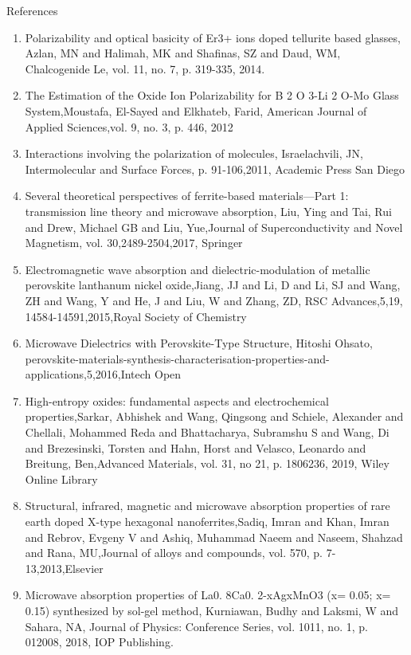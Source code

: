 \documentclass[11pt,aspect ratio=169]{beamer}
\begin{document}
\begin{frame}[allowframebreaks]{References}
\begin{enumerate}
\item
 Polarizability and optical basicity of Er3+ ions doped tellurite based glasses,
	Azlan, MN and Halimah, MK and Shafinas, SZ and Daud, WM,
Chalcogenide Le,	vol. 11,	no. 7,	p. 319-335,	2014.

\item
 The Estimation of the Oxide Ion Polarizability for B 2 O 3-Li 2 O-Mo Glass System,Moustafa, El-Sayed and Elkhateb, Farid,
American Journal of Applied Sciences,vol. 9,	no. 3,	p. 446,
2012

\item
 Interactions involving the polarization of molecules,
Israelachvili, JN,
Intermolecular and Surface Forces,
p. 91-106,2011,	Academic Press San Diego

\item Several theoretical perspectives of ferrite-based materials—Part 1: transmission line theory and microwave absorption,	Liu, Ying and Tai, Rui and Drew, Michael GB and Liu, Yue,Journal of Superconductivity and Novel Magnetism,
	vol. 30,2489-2504,2017,
	Springer

\item
 Electromagnetic wave absorption and dielectric-modulation of metallic perovskite lanthanum nickel oxide,Jiang, JJ and Li, D and Li, SJ and Wang, ZH and Wang, Y and He, J and Liu, W and Zhang, ZD, RSC Advances,5,19,
14584-14591,2015,Royal Society of Chemistry

\item Microwave Dielectrics with Perovskite-Type Structure,
Hitoshi Ohsato,
perovskite-materials-synthesis-characterisation-properties-and-applications,5,2016,Intech Open

\item High-entropy oxides: fundamental aspects and electrochemical properties,Sarkar, Abhishek and Wang, Qingsong and Schiele, Alexander and Chellali, Mohammed Reda and Bhattacharya, Subramshu S and Wang, Di and Brezesinski, Torsten and Hahn, Horst and Velasco, Leonardo and Breitung, Ben,Advanced Materials,
	vol. 31,
	no 21,
	p. 1806236,
	2019,
	Wiley Online Library

\item Structural, infrared, magnetic and microwave absorption properties of rare earth doped X-type hexagonal nanoferrites,Sadiq, Imran and Khan, Imran and Rebrov, Evgeny V and Ashiq, Muhammad Naeem and Naseem, Shahzad and Rana, MU,Journal of alloys and compounds,
	vol. 570,
	p. 7-13,2013,Elsevier
	
	
\item   Microwave absorption properties of La0. 8Ca0. 2-xAgxMnO3 (x= 0.05; x= 0.15) synthesized by sol-gel method,
	Kurniawan, Budhy and Laksmi, W and Sahara, NA,
	Journal of Physics: Conference Series,
	vol. 1011,
	no. 1,
	p. 012008,
	2018,
	IOP Publishing.
	

\end{enumerate}
\end{frame}
\end{document}
